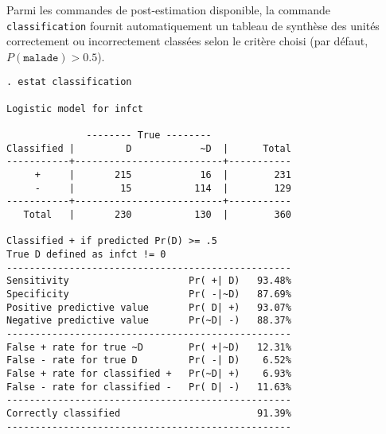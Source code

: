 Parmi les commandes de post-estimation disponible, la commande
\texttt{classification} fournit automatiquement un tableau de synthèse des
unités correctement ou incorrectement classées selon le critère choisi (par
défaut, $P(\texttt{malade})>0.5$).
\begin{verbatim}
. estat classification

Logistic model for infct

              -------- True --------
Classified |         D            ~D  |      Total
-----------+--------------------------+-----------
     +     |       215            16  |        231
     -     |        15           114  |        129
-----------+--------------------------+-----------
   Total   |       230           130  |        360

Classified + if predicted Pr(D) >= .5
True D defined as infct != 0
--------------------------------------------------
Sensitivity                     Pr( +| D)   93.48%
Specificity                     Pr( -|~D)   87.69%
Positive predictive value       Pr( D| +)   93.07%
Negative predictive value       Pr(~D| -)   88.37%
--------------------------------------------------
False + rate for true ~D        Pr( +|~D)   12.31%
False - rate for true D         Pr( -| D)    6.52%
False + rate for classified +   Pr(~D| +)    6.93%
False - rate for classified -   Pr( D| -)   11.63%
--------------------------------------------------
Correctly classified                        91.39%
--------------------------------------------------
\end{verbatim}





